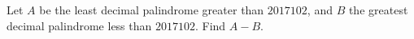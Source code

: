 Let $ A $ be the least decimal palindrome greater than $ 2017102 $, and $ B $ the greatest decimal palindrome less than $2017102$. Find $ A-B $.
